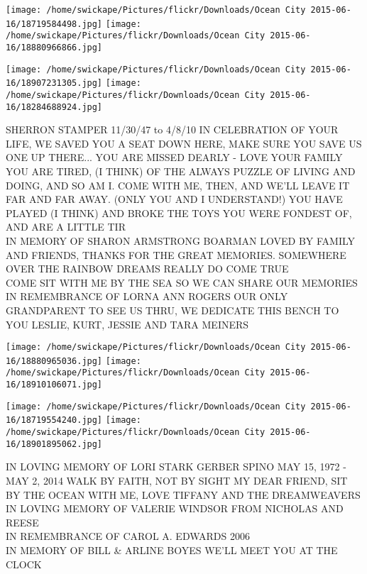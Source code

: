 \documentclass[10pt,letterpaper]{article}
\begin{document}
\texttt{[image: /home/swickape/Pictures/flickr/Downloads/Ocean City 2015-06-16/18719584498.jpg]}
\texttt{[image: /home/swickape/Pictures/flickr/Downloads/Ocean City 2015-06-16/18880966866.jpg]}

\texttt{[image: /home/swickape/Pictures/flickr/Downloads/Ocean City 2015-06-16/18907231305.jpg]}
\texttt{[image: /home/swickape/Pictures/flickr/Downloads/Ocean City 2015-06-16/18284688924.jpg]}

SHERRON STAMPER 11/30/47 to 4/8/10 IN CELEBRATION OF YOUR LIFE, WE SAVED YOU A SEAT DOWN HERE, MAKE SURE YOU SAVE US ONE UP THERE...  YOU ARE MISSED DEARLY {-} LOVE YOUR FAMILY\\
YOU ARE TIRED, (I THINK) OF THE ALWAYS PUZZLE OF LIVING AND DOING, AND SO AM I.  COME WITH ME, THEN, AND WE'LL LEAVE IT FAR AND FAR AWAY.  (ONLY YOU AND I UNDERSTAND!)  YOU HAVE PLAYED (I THINK) AND BROKE THE TOYS YOU WERE FONDEST OF, AND ARE A LITTLE TIR\\
IN MEMORY OF SHARON ARMSTRONG BOARMAN LOVED BY FAMILY AND FRIENDS, THANKS FOR THE GREAT MEMORIES.  SOMEWHERE OVER THE RAINBOW DREAMS REALLY DO COME TRUE\\
COME SIT WITH ME BY THE SEA SO WE CAN SHARE OUR MEMORIES IN REMEMBRANCE OF LORNA ANN ROGERS OUR ONLY GRANDPARENT TO SEE US THRU, WE DEDICATE THIS BENCH TO YOU LESLIE, KURT, JESSIE AND TARA MEINERS\\
\pagebreak

\texttt{[image: /home/swickape/Pictures/flickr/Downloads/Ocean City 2015-06-16/18880965036.jpg]}
\texttt{[image: /home/swickape/Pictures/flickr/Downloads/Ocean City 2015-06-16/18910106071.jpg]}

\texttt{[image: /home/swickape/Pictures/flickr/Downloads/Ocean City 2015-06-16/18719554240.jpg]}
\texttt{[image: /home/swickape/Pictures/flickr/Downloads/Ocean City 2015-06-16/18901895062.jpg]}

IN LOVING MEMORY OF LORI STARK GERBER SPINO MAY 15, 1972 {-} MAY 2, 2014 WALK BY FAITH, NOT BY SIGHT MY DEAR FRIEND, SIT BY THE OCEAN WITH ME, LOVE TIFFANY AND THE DREAMWEAVERS\\
IN LOVING MEMORY OF VALERIE WINDSOR FROM NICHOLAS AND REESE\\
IN REMEMBRANCE OF CAROL A. EDWARDS 2006\\
IN MEMORY OF BILL \& ARLINE BOYES WE'LL MEET YOU AT THE CLOCK\\
\pagebreak
\end{document}
